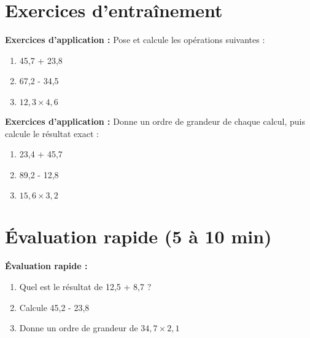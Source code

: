 \section{Exercices d'entraînement}

\begin{exercisebox}
\textbf{Exercices d'application :} Pose et calcule les opérations suivantes :
\begin{enumerate}
	\item 45,7 + 23,8
	\item 67,2 - 34,5
	\item $12,3 \times 4,6$
\end{enumerate}
\end{exercisebox}

\begin{exercisebox}
\textbf{Exercices d'application :} Donne un ordre de grandeur de chaque calcul, puis calcule le résultat exact :
\begin{enumerate}
	\item 23,4 + 45,7
	\item 89,2 - 12,8
	\item $15,6 \times 3,2$
\end{enumerate}
\end{exercisebox}

\section{Évaluation rapide (5 à 10 min)}

\begin{exercisebox}
\textbf{Évaluation rapide :}
\begin{enumerate}
	\item Quel est le résultat de 12,5 + 8,7 ?
	\item Calcule 45,2 - 23,8
	\item Donne un ordre de grandeur de $34,7 \times 2,1$
\end{enumerate}
\end{exercisebox}
